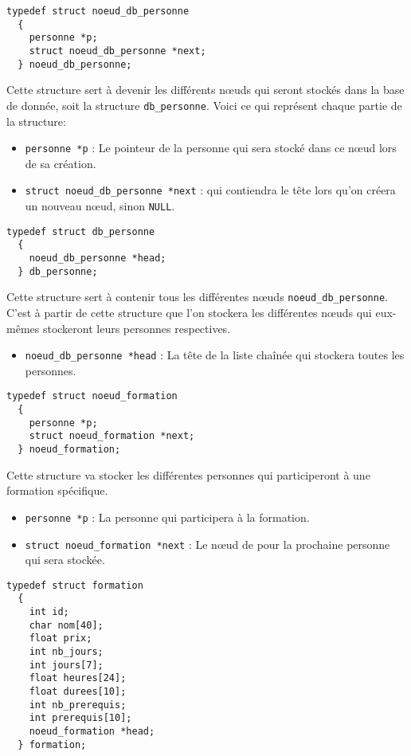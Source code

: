 \documentclass[10pt]{article}
\begin{document}
\begin{lstlisting}[firstnumber=51]
  typedef struct noeud_db_personne
  {
    personne *p;
    struct noeud_db_personne *next;
  } noeud_db_personne;
\end{lstlisting}

Cette structure sert à devenir les différents n\oe{}uds qui seront stockés dans la base de donnée, soit la structure \texttt{db\_personne}.
Voici ce qui représent chaque partie de la structure:
\begin{itemize}
\item \texttt{personne *p} : Le pointeur de la personne qui sera stocké dans ce n\oe{}ud lors de sa création.
\item \texttt{struct noeud\_db\_personne *next} : qui contiendra le tête lors qu'on créera un nouveau n\oe{}ud, sinon \texttt{NULL}.
\end{itemize}

\begin{lstlisting}[firstnumber=63]
  typedef struct db_personne
  {
    noeud_db_personne *head;
  } db_personne;
\end{lstlisting}

Cette structure sert à contenir tous les différentes n\oe{}uds \texttt{noeud\_db\_personne}. C'est à partir de cette structure que l'on stockera les différentes n\oe{}uds qui eux-mêmes stockeront leurs personnes respectives.
\begin{itemize}
\item \texttt{noeud\_db\_personne *head} : La tête de la liste chaînée qui stockera toutes les personnes.
\end{itemize}

\begin{lstlisting}[firstnumber=73]
  typedef struct noeud_formation
  {
    personne *p;
    struct noeud_formation *next;
  } noeud_formation;
\end{lstlisting}

Cette structure va stocker les différentes personnes qui participeront à une formation spécifique.
\begin{itemize}
\item \texttt{personne *p} : La personne qui participera à la formation.
\item \texttt{struct noeud\_formation *next} : Le n\oe{}ud de pour la prochaine personne qui sera stockée.
\end{itemize}

\begin{lstlisting}[firstnumber=94]
  typedef struct formation
  {
    int id;
    char nom[40];
    float prix;
    int nb_jours;
    int jours[7];
    float heures[24];
    float durees[10];
    int nb_prerequis;
    int prerequis[10];
    noeud_formation *head;
  } formation;
\end{lstlisting}
\end{document}
